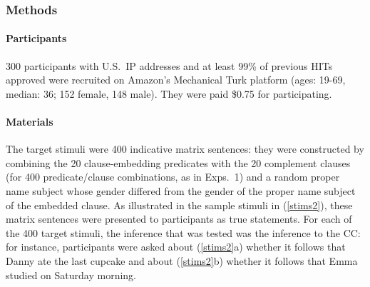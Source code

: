 \documentclass[11pt,fleqn]{article}
\newcommand{\jd}[1]{\textbf{\textcolor{Pink}{[jd: #1]}}}
\newcommand{\6}{\mbox{$[\hspace*{-.6mm}[$}}
\newcommand{\9}{\mbox{$]\hspace*{-.6mm}]$}}
\begin{document}
%

\subsubsection{Methods}

\paragraph{Participants} 300 participants with U.S.\ IP addresses and at least 99\% of previous HITs approved were recruited on Amazon's Mechanical Turk platform (ages: 19-69, median: 36; 152 female, 148 male). They were paid \$0.75 for participating.

\paragraph{Materials} The target stimuli were 400 indicative matrix sentences: they were constructed by combining the 20 clause-embedding predicates with the 20 complement clauses (for 400 predicate/clause combinations, as in Exps.~1) and a random proper name subject whose gender differed from the gender of the proper name subject of the embedded clause. As illustrated in the sample stimuli in (\ref{stims2}), these matrix sentences were presented to participants as true statements. For each of the 400 target stimuli, the inference that was tested was the inference to the CC: for instance, participants were asked about (\ref{stims2}a) whether it follows that Danny ate the last cupcake and about (\ref{stims2}b) whether it follows that Emma studied on Saturday morning.
\end{document}

